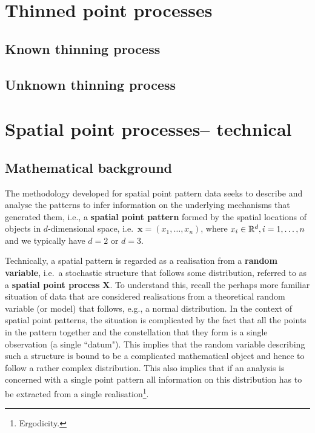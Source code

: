 \section{Thinned point processes}

\subsection{Known thinning process}

\subsection{Unknown thinning process}

\section{Spatial point processes-- technical}
\subsection{Mathematical background}\label{ch1_maths}
The methodology developed for spatial point pattern data seeks to describe and analyse the patterns to infer information on the underlying mechanisms that generated them, i.e., a \textbf{spatial point pattern} formed by the spatial locations of objects in $d$-dimensional space, i.e.\ $\mathbf{x}=(x_1, \ldots, x_n)$, where $x_i \in \mathbb{R}^d, i = 1, \ldots, n$ and we typically have $d = 2$ or $d = 3$. 


Technically, a spatial pattern is regarded as a realisation from a \textbf{random variable}, i.e.\  a stochastic structure that follows some distribution, referred to as a \textbf{spatial point process} $\mathbf{X}$. To understand this, recall the perhaps more familiar situation of data that are considered realisations from a theoretical random variable (or model) that follows, e.g., a normal distribution. In the context of spatial point patterns, the situation is complicated by the fact that all the points in the pattern together and the constellation that they form is a single observation (a single ``datum"). This implies that the random variable describing such a structure is bound to be a complicated mathematical object and hence to follow a rather complex distribution. This also implies that if an analysis is concerned with a single point pattern all information on this distribution has to be extracted from a single realisation\footnote{Ergodicity.}.

